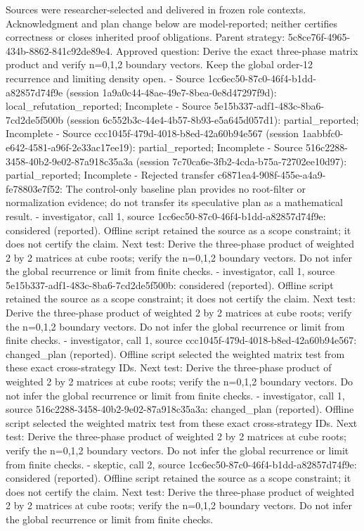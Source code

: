 \documentclass[11pt]{article}
\begin{document}
Sources were researcher-selected and delivered in frozen role contexts. Acknowledgment and plan change below are model-reported; neither certifies correctness or closes inherited proof obligations.
Parent strategy: 5c8ce76f-4965-434b-8862-841c92de89e4. Approved question: Derive the exact three-phase matrix product and verify n=0,1,2 boundary vectors. Keep the global order-12 recurrence and limiting density open.
- Source 1cc6ec50-87c0-46f4-b1dd-a82857d74f9e (session 1a9a0c44-48ae-49e7-8bea-0e8d47297f9d): local\_refutation\_reported; Incomplete
- Source 5e15b337-adf1-483c-8ba6-7cd2de5f500b (session 6c552b3c-44e4-4b57-8b93-e5a645d057d1): partial\_reported; Incomplete
- Source ccc1045f-479d-4018-b8ed-42a60b94e567 (session 1aabbfc0-e642-4581-a96f-2e33ac17ee19): partial\_reported; Incomplete
- Source 516c2288-3458-40b2-9e02-87a918c35a3a (session 7c70ca6e-3fb2-4cda-b75a-72702ee10d97): partial\_reported; Incomplete
- Rejected transfer c6871ea4-908f-455e-a4a9-fe78803e7f52: The control-only baseline plan provides no root-filter or normalization evidence; do not transfer its speculative plan as a mathematical result.
- investigator, call 1, source 1cc6ec50-87c0-46f4-b1dd-a82857d74f9e: considered (reported). Offline script retained the source as a scope constraint; it does not certify the claim. Next test: Derive the three-phase product of weighted 2 by 2 matrices at cube roots; verify the n=0,1,2 boundary vectors. Do not infer the global recurrence or limit from finite checks.
- investigator, call 1, source 5e15b337-adf1-483c-8ba6-7cd2de5f500b: considered (reported). Offline script retained the source as a scope constraint; it does not certify the claim. Next test: Derive the three-phase product of weighted 2 by 2 matrices at cube roots; verify the n=0,1,2 boundary vectors. Do not infer the global recurrence or limit from finite checks.
- investigator, call 1, source ccc1045f-479d-4018-b8ed-42a60b94e567: changed\_plan (reported). Offline script selected the weighted matrix test from these exact cross-strategy IDs. Next test: Derive the three-phase product of weighted 2 by 2 matrices at cube roots; verify the n=0,1,2 boundary vectors. Do not infer the global recurrence or limit from finite checks.
- investigator, call 1, source 516c2288-3458-40b2-9e02-87a918c35a3a: changed\_plan (reported). Offline script selected the weighted matrix test from these exact cross-strategy IDs. Next test: Derive the three-phase product of weighted 2 by 2 matrices at cube roots; verify the n=0,1,2 boundary vectors. Do not infer the global recurrence or limit from finite checks.
- skeptic, call 2, source 1cc6ec50-87c0-46f4-b1dd-a82857d74f9e: considered (reported). Offline script retained the source as a scope constraint; it does not certify the claim. Next test: Derive the three-phase product of weighted 2 by 2 matrices at cube roots; verify the n=0,1,2 boundary vectors. Do not infer the global recurrence or limit from finite checks.
\end{document}

